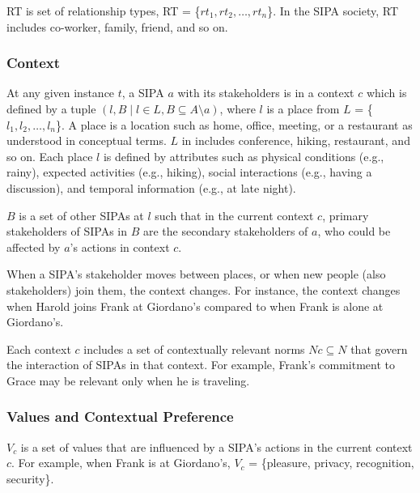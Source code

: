RT is set of
relationship types, RT = \{$rt_1, rt_2, \ldots, rt_n$\}. In the \locationapp SIPA society, RT includes co-worker, family, friend, and so on. 

\subsubsection{Context}
At any given instance $t$, a SIPA $a$ with its stakeholders is in a context $c$ which is defined by a
tuple $(l, B \mid l \in L, B \subseteq A \setminus a)$, where $l$ is a place from $L$ = \{$l_1, l_2, \ldots, l_n$\}. A place is a location such as home, office, meeting, or a restaurant as understood in conceptual terms. $L$ in \locationapp includes conference, hiking, restaurant, and so on.
Each place $l$ is defined by attributes such as physical conditions (e.g., rainy), expected activities (e.g., hiking), social interactions (e.g., having a discussion), and temporal information (e.g., at late night).

$B$ is a set of other SIPAs at $l$ such that in the current context $c$, primary stakeholders of SIPAs in $B$ are the secondary stakeholders of $a$, who could be affected by $a$'s actions in context $c$. 

When a SIPA's stakeholder moves between places, or when new people (also stakeholders) join them, the context changes. For instance, the context changes when Harold joins Frank at Giordano's compared to when Frank is alone at Giordano's. 

Each context $c$ includes a set of contextually relevant norms $Nc \subseteq N$ that govern the interaction of SIPAs in that context. For example, Frank's commitment to Grace may be relevant only when he is traveling. 

\subsubsection{Values and Contextual Preference}

$V_c$ is a set of values that are influenced by a SIPA's actions in the current context $c$. 
% 
For example, when Frank is at Giordano's, $V_c$ = \{pleasure, privacy, recognition, security\}.


